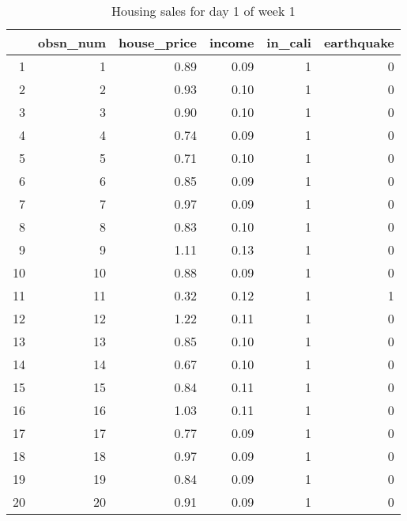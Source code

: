 \begin{table}[ht]
\centering
\begin{tabular}{rrrrrr}
  \hline
 & obsn\_num & house\_price & income & in\_cali & earthquake \\ 
  \hline
1 &   1 & 0.89 & 0.09 &   1 &   0 \\ 
  2 &   2 & 0.93 & 0.10 &   1 &   0 \\ 
  3 &   3 & 0.90 & 0.10 &   1 &   0 \\ 
  4 &   4 & 0.74 & 0.09 &   1 &   0 \\ 
  5 &   5 & 0.71 & 0.10 &   1 &   0 \\ 
  6 &   6 & 0.85 & 0.09 &   1 &   0 \\ 
  7 &   7 & 0.97 & 0.09 &   1 &   0 \\ 
  8 &   8 & 0.83 & 0.10 &   1 &   0 \\ 
  9 &   9 & 1.11 & 0.13 &   1 &   0 \\ 
  10 &  10 & 0.88 & 0.09 &   1 &   0 \\ 
  11 &  11 & 0.32 & 0.12 &   1 &   1 \\ 
  12 &  12 & 1.22 & 0.11 &   1 &   0 \\ 
  13 &  13 & 0.85 & 0.10 &   1 &   0 \\ 
  14 &  14 & 0.67 & 0.10 &   1 &   0 \\ 
  15 &  15 & 0.84 & 0.11 &   1 &   0 \\ 
  16 &  16 & 1.03 & 0.11 &   1 &   0 \\ 
  17 &  17 & 0.77 & 0.09 &   1 &   0 \\ 
  18 &  18 & 0.97 & 0.09 &   1 &   0 \\ 
  19 &  19 & 0.84 & 0.09 &   1 &   0 \\ 
  20 &  20 & 0.91 & 0.09 &   1 &   0 \\ 
   \hline
\end{tabular}
\caption{Housing sales for day 1 of week 1} 
\end{table}
